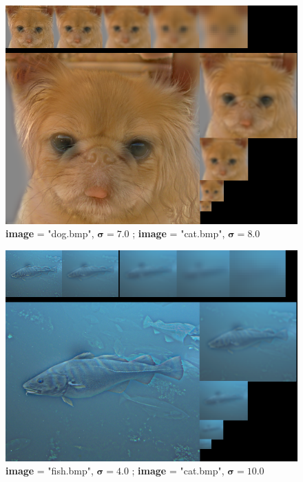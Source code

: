 \documentclass{article}
\begin{document}
\begin{figure}[hbt!]
	\centering
	\includegraphics[width=.9\textwidth]{assets/ex1-A/dog_cat_s8_s7_c.png}
	\caption{\textbf{image} = "dog.bmp", $\boldsymbol{\sigma} = 7.0$ ; \textbf{image} = "cat.bmp", $\boldsymbol{\sigma} = 8.0$}
\end{figure}
\begin{figure}[hbt!]
	\centering
	\includegraphics[width=.9\textwidth]{assets/ex1-A/fish_sub_s4_s10_c.png}
	\caption{\textbf{image} = "fish.bmp", $\boldsymbol{\sigma} = 4.0$ ; \textbf{image} = "cat.bmp", $\boldsymbol{\sigma} = 10.0$}
\end{figure}
\end{document}
